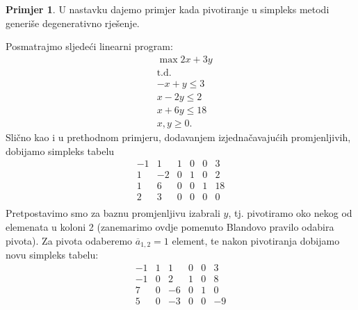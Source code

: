 \documentclass[b5paper, utf8, 11pt, colorlinks]{book}
\theoremstyle{definition}
\newtheorem{primjer}{Primjer}[chapter]
\begin{document}
\begin{primjer} U nastavku dajemo primjer kada pivotiranje u simpleks metodi generiše degenerativno rješenje. 
\end{primjer}
Posmatrajmo sljedeći linearni program:
\begin{align*}
	&\max 2x + 3y \\
	&  {\mbox{t.d.}} \\
	& -x + y \leq 3 \\
	& x - 2y \leq 2 \\
	& x + 6y \leq 18 \\
	& x,y \geq 0. 
\end{align*}
Slično kao i u prethodnom primjeru, dodavanjem izjednačavajućih promjenljivih, dobijamo simpleks 
tabelu 
$$\begin{array}{ccccc|c}
	-1 & 1 & 1 & 0 & 0 & 3 \\
	1 &-2 & 0 & 1 & 0 & 2 \\
	1 & 6 & 0 & 0 & 1 & 18 \\ \hline
	2 & 3 & 0 & 0 & 0 & 0 \\
\end{array}$$
Pretpostavimo smo  za baznu promjenljivu izabrali $y$, tj. pivotiramo oko nekog od elemenata u koloni 2 (zanemarimo ovdje pomenuto Blandovo pravilo odabira pivota). Za pivota odaberemo $\overline{a}_{1,2}=1$ element, te nakon pivotiranja dobijamo novu simpleks tabelu:
$$\begin{array}{ccccc|c}
	-1 & 1 & 1 & 0 & 0 & 3 \\
	-1 & 0 & 2 & 1 & 0 & 8 \\
	7 & 0 & -6 & 0 & 1 & 0 \\ \hline
	5 & 0 & -3 & 0 & 0 & -9 \\
\end{array}$$
\end{document}
